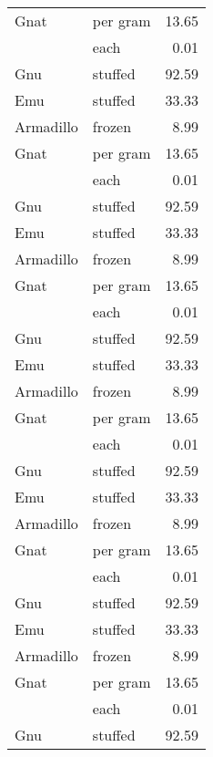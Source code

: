 {\begin{center}
\begin{xtabular}{|llr|}
Gnat      & per gram & 13.65 \\
          & each     & 0.01  \\
Gnu       & stuffed  & 92.59 \\
Emu       & stuffed  & 33.33 \\
Armadillo & frozen   & 8.99  \\
Gnat      & per gram & 13.65 \\
          & each     & 0.01  \\
Gnu       & stuffed  & 92.59 \\
Emu       & stuffed  & 33.33 \\
Armadillo & frozen   & 8.99  \\
Gnat      & per gram & 13.65 \\
          & each     & 0.01  \\
Gnu       & stuffed  & 92.59 \\
Emu       & stuffed  & 33.33 \\
Armadillo & frozen   & 8.99  \\
Gnat      & per gram & 13.65 \\
          & each     & 0.01  \\
Gnu       & stuffed  & 92.59 \\
Emu       & stuffed  & 33.33 \\
Armadillo & frozen   & 8.99  \\
Gnat      & per gram & 13.65 \\
          & each     & 0.01  \\
Gnu       & stuffed  & 92.59 \\
Emu       & stuffed  & 33.33 \\
Armadillo & frozen   & 8.99  \\
Gnat      & per gram & 13.65 \\
          & each     & 0.01  \\
Gnu       & stuffed  & 92.59 \\

\end{xtabular}
\end{center}}

